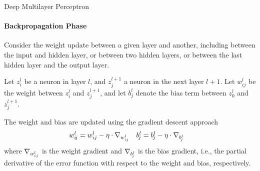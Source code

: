 %
%
%
\begin{frame}{Deep Multilayer Perceptron}
\framesubtitle{Backpropagation Phase}
Consider the weight update between a given layer and another, including
between the input and hidden layer, or between two hidden layers, or
between the last hidden layer and the output layer. 

\medskip

Let $z^l_i$ be a neuron in layer $l$, and $z^{l+1}_{\!j}$ a neuron in the next
layer $l+1$. Let $w^l_{ij}$ be the weight between $z^l_i$ and
$z^{l+1}_j$, and let $b^l_{\!j}$ denote the bias term between
$z^l_0$ and $z^{l+1}_j$.

\medskip

The weight and bias are updated using the gradient descent approach
\begin{align*}
   w^l_{i\!j} & = w^l_{ij} - \eta \cdot \nabla_{w^l_{ij}} &
   b^l_{\!j} & = b^l_{\!j} - \eta \cdot \nabla_{b^l_{\!j}}
\end{align*}
where $\nabla_{w^l_{ij}}$ is the weight gradient and
$\nabla_{b^l_{\!j}}$ is the bias gradient, i.e., the partial
derivative of the error function with
respect to the weight and bias, respectively.
\end{frame}
